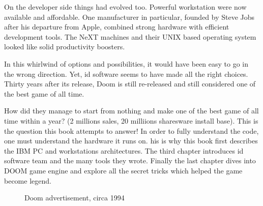  \par
 On the developer side things had evolved too. Powerful workstation were now available and affordable. One manufacturer in particular, founded by Steve Jobs after his departure from Apple, combined strong hardware with efficient development tools. The NeXT machines and their UNIX based operating system looked like solid productivity boosters.\\
 \par
 In this whirlwind of options and possibilities, it would have been easy to go in the wrong direction. Yet, id software seems to have made all the right choices. Thirty years after its release, Doom is still re-released and still considered one of the best game of all time.\\
\par
 How did they manage to start from nothing and make one of the best game of all time within a year? (2 millions sales, 20 milliions sharesware install base). This is the question this book attempts to answer! In order to fully understand the code, one must understand the hardware it runs on. his is why this book first describes the IBM PC and \NeXT workstations architectures. The third chapter introduces id software team and the many tools they wrote. Finally the last chapter dives into DOOM game engine and explore all the secret tricks which helped the game become legend.\\
\par

\begin{figure}[H]
\centering
{}
\caption{Doom advertisement, circa 1994}
\end{figure}